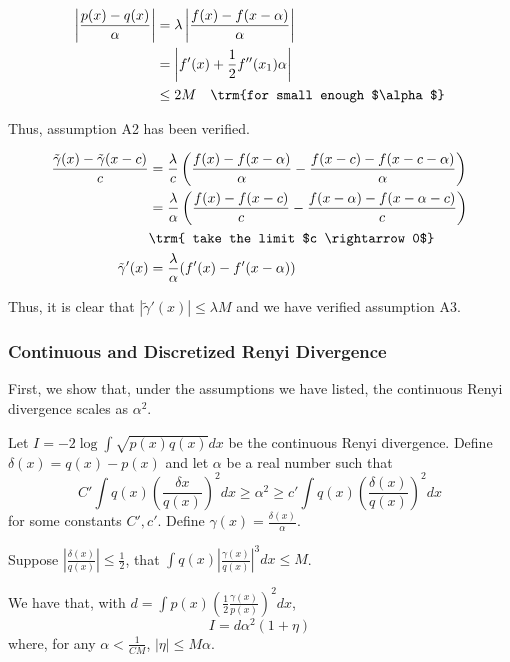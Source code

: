 \documentclass{article}
\begin{document}
\begin{example}
\begin{align*}
\left| \frac{ p(x) - q(x)}{\alpha} \right| &= \lambda \left| \frac{f(x) - f(x-\alpha)}{\alpha} \right| \\
 &= \left| f'(x) + \frac{1}{2} f''(x_1) \alpha \right| \\
 &\leq 2M  \quad \trm{for small enough $\alpha$}
\end{align*}

Thus, assumption A2 has been verified. 

\begin{align*}
\frac{ \tilde{\gamma}(x) - \tilde{\gamma}(x - c) }{c} &= 
 \frac{\lambda}{c} \left(   \frac{f(x) - f(x-\alpha)}{\alpha} - \frac{f(x-c) - f(x-c - \alpha)}{\alpha}  \right) \\
  &= \frac{\lambda}{\alpha} \left( \frac{f(x) - f(x-c)}{c} - 
                  \frac{ f(x-\alpha) - f(x - \alpha - c)}{c} \right) \\
 &\trm{ take the limit $c \rightarrow 0$} \\
\tilde{\gamma}'(x) &= \frac{\lambda}{\alpha} (f'(x) - f'(x-\alpha) ) 
\end{align*}

Thus, it is clear that $ | \tilde{\gamma}'(x) | \leq \lambda M$ and we have verified assumption A3. 

\end{example}

\subsubsection{Continuous and Discretized Renyi Divergence}

First, we show that, under the assumptions we have listed, the continuous Renyi divergence scales as $\alpha^2$. 

\begin{proposition}
\label{prop:continuous_renyi_order}
Let $I = -2 \log \int \sqrt{p(x)q(x)} dx$ be the continuous Renyi divergence. Define $\delta(x) = q(x) - p(x)$ and let $\alpha$ be a real number such that 
\[
C' \int q(x) \left( \frac{\delta{x}}{q(x)} \right)^2 dx \geq \alpha^2 \geq c' \int q(x) \left( \frac{\delta(x)}{q(x)} \right)^2 dx
\]
 for some constants $C', c'$. Define $\gamma(x) = \frac{\delta(x)}{\alpha}$. 

Suppose $\left| \frac{\delta(x)}{q(x)} \right| \leq \frac{1}{2}$, that 
$ \int q(x) \left| \frac{\gamma(x)}{q(x)} \right|^3 dx \leq M$.

We have that, with $d = \int p(x) \left( \frac{1}{2} \frac{\gamma(x)}{p(x)} \right)^2 dx$,
\[
I = d \alpha^2 ( 1 + \eta )
\]
where, for any $\alpha < \frac{1}{CM}$, $|\eta| \leq M \alpha$. 

\end{proposition}
\end{document}
